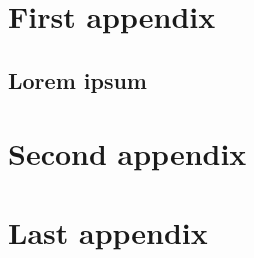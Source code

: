 %


\cleardoublepage

%

\appendix
{}


\chapter{First appendix}
\lipsum[1]
\section*{Lorem ipsum}
\lipsum[2-4]

\chapter{Second appendix}
\lipsum[5-8]

\chapter{Last appendix}
\lipsum[9-12]


